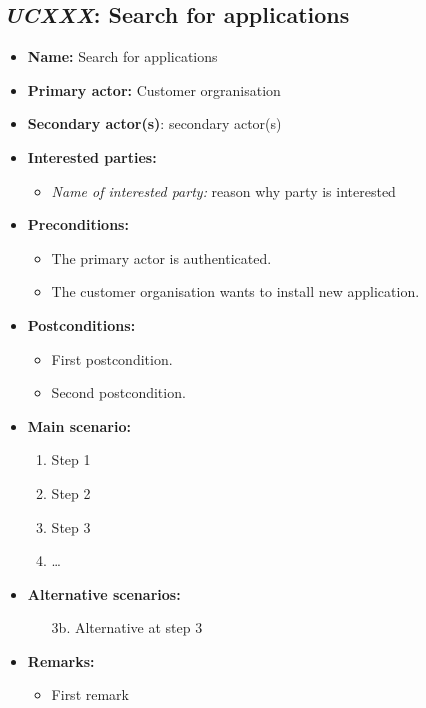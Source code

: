 \subsection{\emph{UCXXX}: Search for applications}
\begin{itemize}
    \item \textbf{Name:} Search for applications
    \item \textbf{Primary actor:} Customer orgranisation
    \item \textbf{Secondary actor(s)}: secondary actor(s)
    \item \textbf{Interested parties:}
        \begin{itemize}
            \item \textit{Name of interested party:} reason why party is interested
        \end{itemize}

    \item \textbf{Preconditions:}
        \begin{itemize}
            \item The primary actor is authenticated.
            \item The customer organisation wants to install new application.
        \end{itemize}

    \item \textbf{Postconditions:}
        \begin{itemize}
            \item First postcondition.
            \item Second postcondition.
        \end{itemize}

    \item \textbf{Main scenario:}
    \begin{enumerate}
       \item Step 1
       \item Step 2
       \item Step 3
       \item \ldots
    \end{enumerate}

    \item \textbf{Alternative scenarios:}
    \begin{enumerate}
        \item [3b.] Alternative at step 3
    \end{enumerate}

    \item \textbf{Remarks:}
        \begin{itemize}
            \item First remark
        \end{itemize}
\end{itemize}

